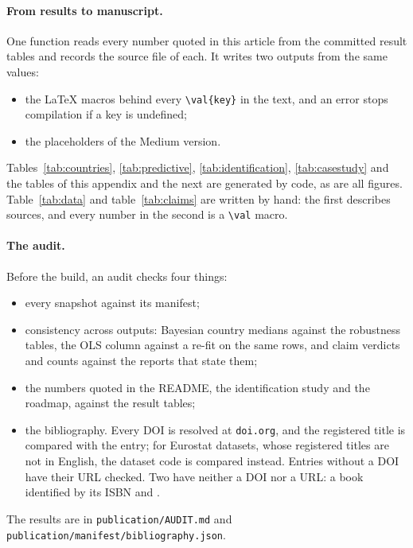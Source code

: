 \paragraph{From results to manuscript.} One function reads every number quoted in this
article from the committed result tables and records the source file of each. It writes
two outputs from the same values:
\begin{itemize}
  \item the LaTeX macros behind every \verb|\val{key}| in the text, and an error stops
    compilation if a key is undefined;
  \item the placeholders of the Medium version.
\end{itemize}
Tables~\ref{tab:countries}, \ref{tab:predictive}, \ref{tab:identification},
\ref{tab:casestudy} and the tables of this appendix and the next are generated by code, as
are all figures. Table~\ref{tab:data} and table~\ref{tab:claims} are written by hand: the
first describes sources, and every number in the second is a \verb|\val| macro.

\paragraph{The audit.} Before the build, an audit checks four things:
\begin{itemize}
  \item every snapshot against its manifest;
  \item consistency across outputs: Bayesian country medians against the robustness
    tables, the OLS column against a re-fit on the same rows, and claim verdicts and
    counts against the reports that state them;
  \item the numbers quoted in the README, the identification study and the roadmap,
    against the result tables;
  \item the bibliography. Every DOI is resolved at \texttt{doi.org}, and the registered
    title is compared with the entry; for Eurostat datasets, whose registered titles are
    not in English, the dataset code is compared instead. Entries without a DOI have their
    URL checked. Two have neither a DOI nor a URL: a book identified by its ISBN and
    \citet{okun1962}.
\end{itemize}
The results are in \texttt{publication/AUDIT.md} and
\texttt{publication/manifest/bibliography.json}.

